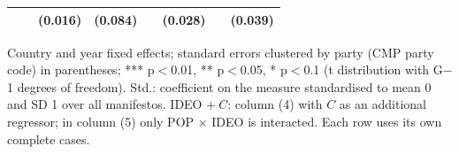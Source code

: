\begin{table}[ht]
{\begin{tabular}{lrrrrrrr}
 & & (0.016) & (0.084) & & (0.028) & & (0.039) \\
\bottomrule
\end{tabular}}
\par\smallskip
\begin{minipage}{\linewidth}\scriptsize Country and year fixed effects; standard errors clustered by party (CMP party code) in parentheses; *** p$<$0.01, ** p$<$0.05, * p$<$0.1 (t distribution with G$-$1 degrees of freedom). Std.: coefficient on the measure standardised to mean 0 and SD 1 over all manifestos. IDEO $+\ C$: column (4) with $C$ as an additional regressor; in column (5) only POP $\times$ IDEO is interacted. Each row uses its own complete cases.\end{minipage}
\end{table}
